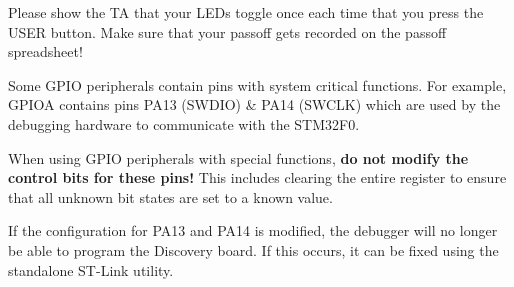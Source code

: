\documentclass[openany,11pt,fleqn]{book} %
\begin{document}
\begin{assignment}
	Please show the TA that your LEDs toggle once each time that you press the USER button. Make sure that your passoff gets recorded on the passoff spreadsheet!
\end{assignment}

\begin{warning}
    Some GPIO peripherals contain pins with system critical functions. For example, GPIOA contains pins PA13 (SWDIO) \& PA14 (SWCLK) which are used by the debugging hardware to communicate with the STM32F0. 
    
    When using GPIO peripherals with special functions, \textbf{do not modify the control bits for these pins!} This includes clearing the entire register to ensure that all unknown bit states are set to a known value. 
    
    If the configuration for PA13 and PA14 is modified, the debugger will no longer be able to program the Discovery board. If this occurs, it can be fixed using the standalone ST-Link utility.
\end{warning}
\end{document}
